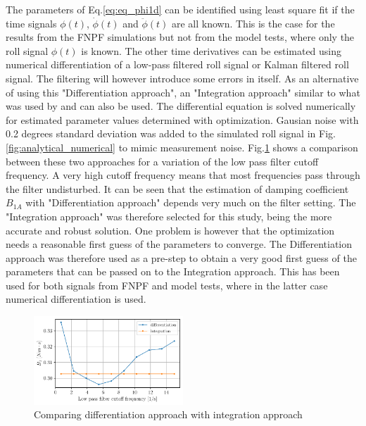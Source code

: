 The parameters of Eq.\ref{eq:eq_phi1d} can be identified using
least square fit if the time signals $\phi(t)$, $\dot{\phi}(t)$ and
$\ddot{\phi}(t)$ are all known. This is the case for the results from
the FNPF simulations but not from the model tests, where only the roll
signal $\phi(t)$ is known. The other time derivatives can be estimated
using numerical differentiation of a low-pass filtered roll signal or
Kalman filtered roll signal. The filtering will however introduce some
errors in itself. As an alternative of using this "Differentiation
approach", an "Integration approach" similar to what was used by
\citep{7505983/FJHQJJUH} and \citep{7505983/24TNAV5Z} can also be used.
The differential equation is solved numerically for estimated parameter
values determined with optimization. Gausian noise with 0.2 degrees
standard deviation was added to the simulated roll signal in
Fig.\ref{fig:analytical_numerical} to mimic measurement noise.
Fig.\ref{fig:diff_vs_int} shows a comparison between these two
approaches for a variation of the low pass filter cutoff frequency. A
very high cutoff frequency means that most frequencies pass through the
filter undisturbed. It can be seen that the estimation of damping
coefficient $B_{1A}$ with "Differentiation approach" depends very much
on the filter setting. The "Integration approach" was therefore selected
for this study, being the more accurate and robust solution. One problem
is however that the optimization needs a reasonable first guess of the
parameters to converge. The Differentiation approach was therefore used
as a pre-step to obtain a very good first guess of the parameters that
can be passed on to the Integration approach. This has been used for
both signals from FNPF and model tests, where in the latter case
numerical differentiation is used.
\begin{figure}[H]
\begin{center}\includegraphics[width = 0.5\textwidth]{figures/diff_vs_int.pdf}\end{center}
\vspace{-1cm}
\caption{Comparing differentiation approach with integration approach}
\label{fig:diff_vs_int}
\end{figure}
